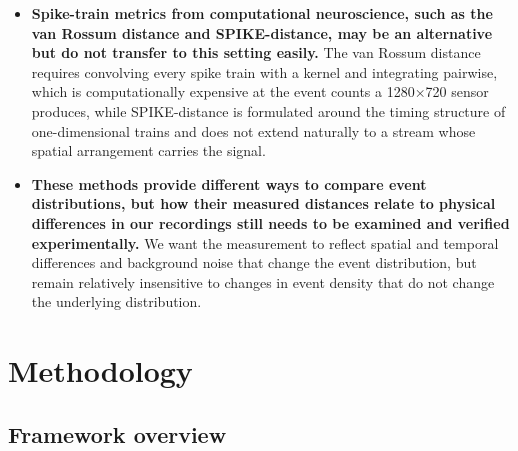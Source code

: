 \begin{itemize}
  \item \textbf{Spike-train metrics from computational neuroscience, such as the van Rossum distance and SPIKE-distance, may be an alternative but do not transfer to this setting easily.} The van Rossum distance requires convolving every spike train with a kernel and integrating pairwise, which is computationally expensive at the event counts a 1280×720 sensor produces, while SPIKE-distance is formulated around the timing structure of one-dimensional trains and does not extend naturally to a stream whose spatial arrangement carries the signal. \cite{vanrossum2001novel,kreuz2013monitoring}

  \item \textbf{These methods provide different ways to compare event distributions, but how their measured distances relate to physical differences in our recordings still needs to be examined and verified experimentally.} We want the measurement to reflect spatial and temporal differences and background noise that change the event distribution, but remain relatively insensitive to changes in event density that do not change the underlying distribution.
  
\end{itemize}

\section{Methodology}

\subsection{Framework overview}

